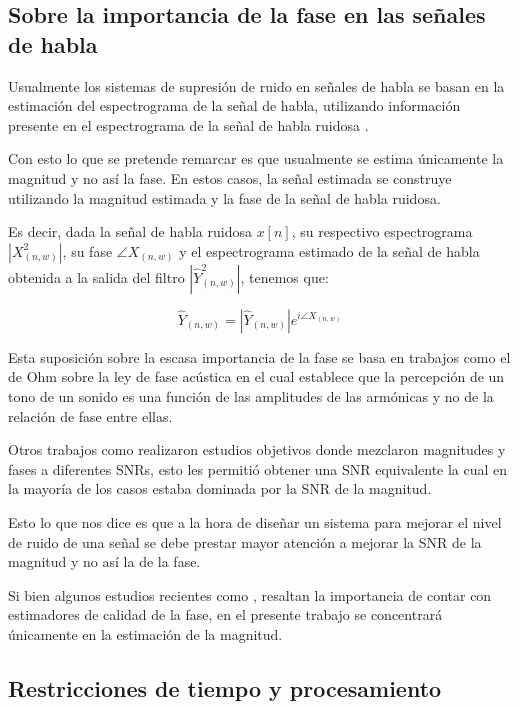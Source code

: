 \subsection{Sobre la importancia de la fase en las señales de habla} \label{sec:sobre_la_importancia_de_la_fase_en_las_señales_de_habla}

Usualmente los sistemas de supresión de ruido en señales de habla se basan en la estimación del espectrograma de la señal de habla, utilizando información presente en el espectrograma de la señal de habla ruidosa . 

Con esto lo que se pretende remarcar es que usualmente se estima únicamente la magnitud y no así la fase. En estos casos, la señal estimada se construye utilizando la magnitud estimada y la fase de la señal de habla ruidosa.

Es decir, dada la señal de habla ruidosa $x[n]$, su respectivo espectrograma $|X_{(n, w)}^2|$, su fase $\angle X_{(n, w)}$ y el espectrograma estimado de la señal de habla obtenida a la salida del filtro $|\hat{Y}_{(n, w)}^2|$, tenemos que:

\begin{equation*}
	\hat{Y}_{(n, w)} = |\hat{Y}_{(n, w)}| e^{i\angle X_{(n, w)}}
\end{equation*}

Esta suposición sobre la escasa importancia de la fase se basa en trabajos como el de Ohm sobre la ley de fase acústica \cite{ohm_s_law_of_acoustics} en el cual establece que la percepción de un tono de un sonido es una función de las amplitudes de las armónicas y no de la relación de fase entre ellas. 

Otros trabajos como \cite{the_unimportance_of_phase_in_speech_enhancement} realizaron estudios objetivos donde mezclaron magnitudes y fases a diferentes SNRs, esto les permitió obtener una SNR equivalente la cual en la mayoría de los casos estaba dominada por la SNR de la magnitud.

Esto lo que nos dice es que a la hora de diseñar un sistema para mejorar el nivel de ruido de una señal se debe prestar mayor atención a mejorar la SNR de la magnitud y no así la de la fase.


Si bien algunos estudios recientes como \cite{phase_importance_in_speech_processing_applications}, resaltan la importancia de contar con estimadores de calidad de la fase, en el presente trabajo se concentrará únicamente en la estimación de la magnitud.


\subsection{Restricciones de tiempo y procesamiento}
\label{sec:time_restrictions}

